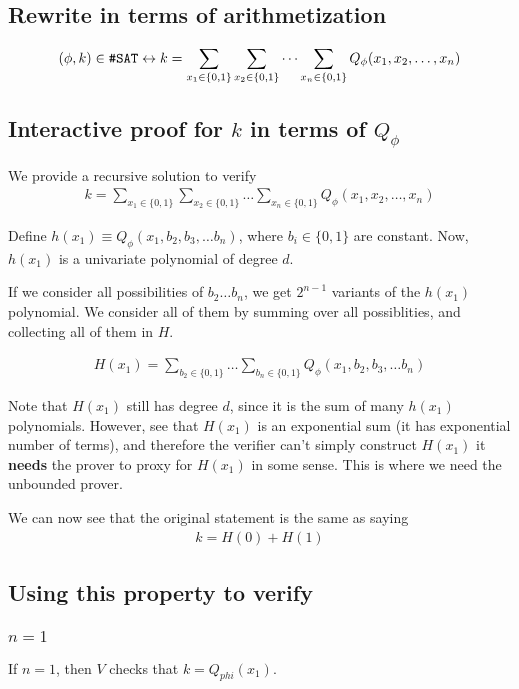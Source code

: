 \subsection{Rewrite \hashsat in terms of arithmetization}
$$
(\phi, k) \in \texttt{\#SAT} \leftrightarrow k = 
    \sum_{x_1 \in \{0, 1\}} \sum_{x_2 \in \{0, 1\}} \dots \sum_{x_n \in \{0, 1\}}
    Q_\phi(x_1, x_2, \dots, x_n)
$$



\subsection{Interactive proof for $k$ in terms of $Q_\phi$}
We provide a recursive solution to verify
\begin{align*}
k = 
    \sum_{x_1 \in \{0, 1\}} \sum_{x_2 \in \{0, 1\}} \dots \sum_{x_n \in \{0, 1\}}
    Q_\phi(x_1, x_2, \dots, x_n)
\end{align*}

Define $h(x_1) \equiv Q_\phi(x_1, b_2, b_3, \dots b_n)$, where $b_i \in \{0, 1\}$ are constant.
Now, $h(x_1)$ is a univariate polynomial of degree $d$.

If we consider all possibilities of $b_2 \dots b_n$, we get $2^{n - 1}$ variants
of the $h(x_1)$ polynomial.  We consider all of them by summing over all possiblities,
and collecting all of them in $H$.

\begin{align*}
H(x_1) = 
     \sum_{b_2 \in \{0, 1\}} \dots \sum_{b_n \in \{0, 1\}} Q_\phi(x_1, b_2, b_3, \dots b_n)
\end{align*}

Note that $H(x_1)$ still has degree $d$, since it is the sum of many $h(x_1)$
polynomials.  However, see that $H(x_1)$ is an exponential sum (it has exponential number of terms), and therefore
the verifier can't simply construct $H(x_1)$ it \textbf{needs} the prover
to proxy for $H(x_1)$ in some sense. This is where we need the unbounded prover.


We can now see that the original statement is the same as saying
\begin{align*}
k = H(0) + H(1)
\end{align*}

\subsection{Using this property to verify}
\subsubsection{$n = 1$}
If $n = 1$, then $V$ checks that $k = Q_{phi}(x_1)$.

